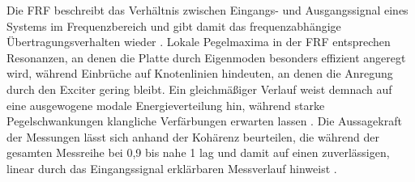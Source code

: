 Die FRF beschreibt das Verhältnis zwischen Eingangs- und Ausgangssignal eines Systems im Frequenzbereich und gibt damit das frequenzabhängige Übertragungsverhalten wieder \cite{Mueller2001,Moeser2020}. Lokale Pegelmaxima in der FRF entsprechen Resonanzen, an denen die Platte durch Eigenmoden besonders effizient angeregt wird, während Einbrüche auf Knotenlinien hindeuten, an denen die Anregung durch den Exciter gering bleibt. Ein gleichmäßiger Verlauf weist demnach auf eine ausgewogene modale Energieverteilung hin, während starke Pegelschwankungen klangliche Verfärbungen erwarten lassen \cite{Harris2000}. Die Aussagekraft der Messungen lässt sich anhand der Kohärenz beurteilen, die während der gesamten Messreihe bei 0,9 bis nahe 1 lag und damit auf einen zuverlässigen, linear durch das Eingangssignal erklärbaren Messverlauf hinweist \cite{Mueller2001}.




